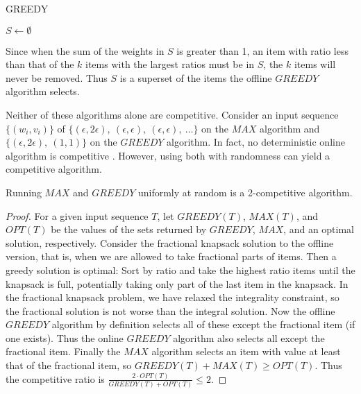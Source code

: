 \begin{algorithm}
	\caption{GREEDY}
	$S \leftarrow \emptyset$\;
\end{algorithm}

Since when the sum of the weights in $S$ is greater than 1, an item with ratio less than that of the $k$ items with the largest ratios must be in $S$, the $k$ items will never be removed. Thus $S$ is a superset of the items the offline $GREEDY$ algorithm selects.

Neither of these algorithms alone are competitive. Consider an input sequence $\{(w_i,v_i)\}$ of $\{(\epsilon,2\epsilon),\ (\epsilon,\epsilon),\ (\epsilon,\epsilon),\ \ldots\}$ on the $MAX$ algorithm and $\{(\epsilon, 2\epsilon),\ (1,1)\}$ on the $GREEDY$ algorithm. In fact, no deterministic online algorithm is competitive \cite{iwama}. However, using both with randomness can yield a competitive algorithm.

\begin{theorem}
	\emph{\cite{han}}
	Running $MAX$ and $GREEDY$ uniformly at random is a 2-competitive algorithm.
\end{theorem}
\begin{proof}
	For a given input sequence $T$, let $GREEDY(T)$, $MAX(T)$, and $OPT(T)$ be the values of the sets returned by $GREEDY$, $MAX$, and an optimal solution, respectively. Consider the fractional knapsack solution to the offline version, that is, when we are allowed to take fractional parts of items. Then a greedy solution is optimal: Sort by ratio and take the highest ratio items until the knapsack is full, potentially taking only part of the last item in the knapsack. In the fractional knapsack problem, we have relaxed the integrality constraint, so the fractional solution is not worse than the integral solution. Now the offline $GREEDY$ algorithm by definition selects all of these except the fractional item (if one exists). Thus the online $GREEDY$ algorithm also selects all except the fractional item. Finally the $MAX$ algorithm selects an item with value at least that of the fractional item, so $GREEDY(T)+MAX(T) \ge OPT(T)$. Thus the competitive ratio is $\frac{2\cdot OPT(T)}{GREEDY(T)+OPT(T)} \le 2$.
\end{proof}

